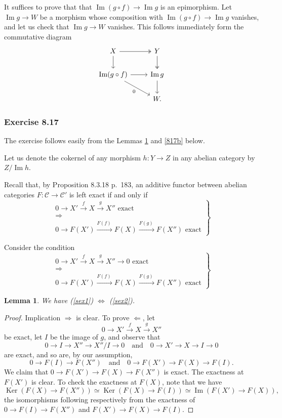 \documentclass[12pt]{article}%
\newtheorem{lem}[thm]{Lemma}
\theoremstyle{remark}
\theoremstyle{definition}
\newcommand{\C}{\mathcal C}
\newcommand{\si}{\Leftarrow}
\newcommand{\ssi}{\Leftrightarrow}%
\newcommand{\then}{\Rightarrow}
\DeclareMathOperator{\Ima}{Im}
\DeclareMathOperator{\Ker}{Ker}
\begin{document}
It suffices to prove that that $\Ima(g\circ f)\to\Ima g$ is an epimorphism. Let $\Ima g\to W$ be a morphism whose composition with $\Ima(g\circ f)\to\Ima g$ vanishes, and let us check that $\Ima g\to W$ vanishes. This follows immediately form the commutative diagram 
$$
\begin{tikzcd}
X\ar{d}\ar[two heads]{r}&Y\ar[two heads]{d}\\ 
\Ima(g\circ f)\ar{dr}[swap]{0}\ar{r}&\Ima g\ar{d}\\ 
{}&W.
\end{tikzcd}
$$
%
%
\subsubsection{Exercise 8.17}
%
The exercise follows easily from the Lemmas \ref{817a} and \ref{817b} below.

Let us denote the cokernel of any morphism $h:Y\to Z$ in any abelian category by $Z/\Ima h$. 

Recall that, by Proposition 8.3.18 p.~183, an additive functor between abelian categories $F:\C\to\C'$ is left exact if and only if
%
\begin{equation}\label{sex1}
\left.
\begin{matrix}
0\to X'\overset{f}{\to}X\overset{g}{\to}X''\text{ exact }\\ 
\then\\ 
0\to F(X')\overset{F(f)\ }{\longrightarrow}F(X)\overset{F(g)\ }{\longrightarrow}F(X'')\text{ exact}
\end{matrix}
\right\}
\end{equation}

Consider the condition
%
\begin{equation}\label{sex2}
\left.
\begin{matrix}
0\to X'\overset{f}{\to}X\overset{g}{\to}X''\to0\text{ exact }\\ 
\then\\ 
0\to F(X')\overset{F(f)\ }{\longrightarrow}F(X)\overset{F(g)\ }{\longrightarrow}F(X'')\text{ exact}
\end{matrix}
\right\}
\end{equation}
%
\begin{lem}\label{817a}
We have (\ref{sex1}) $\ssi$ (\ref{sex2}). 
\end{lem}
%
\begin{proof}
Implication $\then$ is clear. To prove $\si$, let 
$$
0\to X'\overset{f}{\to}X\overset{g}{\to}X''
$$
be exact, let $I$ be the image of $g$, and observe that 
$$
0\to I\to X''\to X''/I\to0\quad\text{and}\quad0\to X'\to X\to I\to0
$$ 
are exact, and so are, by our assumption, 
$$
0\to F(I)\to F(X'')\quad\text{and}\quad0\to F(X')\to F(X)\to F(I).
$$ 
We claim that $0\to F(X')\to F(X)\to F(X'')$ is exact. The exactness at $F(X')$ is clear. To check the exactness at $F(X)$, note that we have 
$$
\Ker(F(X)\to F(X''))\simeq\Ker(F(X)\to F(I))\simeq\Ima(F(X')\to F(X)),
$$ 
the isomorphisms following respectively from the exactness of $0\to F(I)\to F(X'')$ and $F(X')\to F(X)\to F(I)$.
\end{proof}
\end{document}
